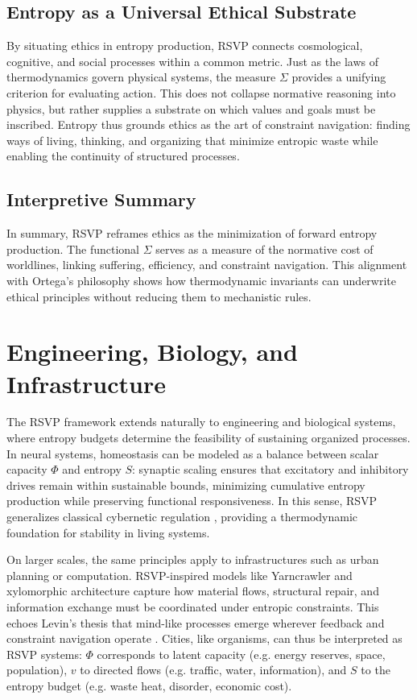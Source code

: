 \documentclass[12pt]{article}
\begin{document}
\subsection{Entropy as a Universal Ethical Substrate}
By situating ethics in entropy production, RSVP connects cosmological, cognitive, and social processes within a common metric. Just as the laws of thermodynamics govern physical systems, the measure $\Sigma$ provides a unifying criterion for evaluating action. This does not collapse normative reasoning into physics, but rather supplies a substrate on which values and goals must be inscribed. Entropy thus grounds ethics as the art of constraint navigation: finding ways of living, thinking, and organizing that minimize entropic waste while enabling the continuity of structured processes.

\subsection{Interpretive Summary}
In summary, RSVP reframes ethics as the minimization of forward entropy production. The functional $\Sigma$ serves as a measure of the normative cost of worldlines, linking suffering, efficiency, and constraint navigation. This alignment with Ortega’s philosophy shows how thermodynamic invariants can underwrite ethical principles without reducing them to mechanistic rules.

\section{Engineering, Biology, and Infrastructure}

The RSVP framework extends naturally to engineering and biological systems, where entropy budgets determine the feasibility of sustaining organized processes. In neural systems, homeostasis can be modeled as a balance between scalar capacity $\Phi$ and entropy $S$: synaptic scaling ensures that excitatory and inhibitory drives remain within sustainable bounds, minimizing cumulative entropy production while preserving functional responsiveness. In this sense, RSVP generalizes classical cybernetic regulation \cite{Wiener1948,Ashby1956}, providing a thermodynamic foundation for stability in living systems.  

On larger scales, the same principles apply to infrastructures such as urban planning or computation. RSVP-inspired models like Yarncrawler and xylomorphic architecture capture how material flows, structural repair, and information exchange must be coordinated under entropic constraints. This echoes Levin’s thesis that mind-like processes emerge wherever feedback and constraint navigation operate \cite{Levin2022}. Cities, like organisms, can thus be interpreted as RSVP systems: $\Phi$ corresponds to latent capacity (e.g. energy reserves, space, population), $v$ to directed flows (e.g. traffic, water, information), and $S$ to the entropy budget (e.g. waste heat, disorder, economic cost).  
\end{document}
